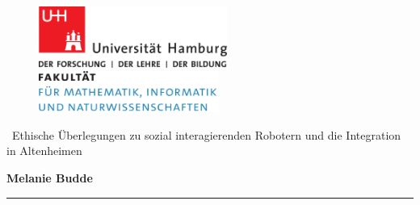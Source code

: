 \begin{titlepage}

  \setcounter{page}{-1}

	\begin{figure}[h]
		\begin{minipage}[b]{62mm}
			\includegraphics[width=62mm]{images/unilogo}
		\end{minipage}
		\hspace{4cm}
		\begin{minipage}[b]{59mm}
			\includegraphics[width=59mm]{images/minlogo}
		\end{minipage}
	\end{figure}

	\vfill
	
	\begin{center}
		
		\vspace{14mm}
		\noindent \huge{\
		  Ethische Überlegungen zu sozial interagierenden Robotern und die Integration in Altenheimen
		}
		\vspace{60mm}	
	\end{center}
	
	\vfill
	
	\noindent \textbf{Melanie Budde} \\
	\noindent \rule{\textwidth}{0.4mm} 
	 \\
	 \\
	 \\


	 \\
	

\end{titlepage}
